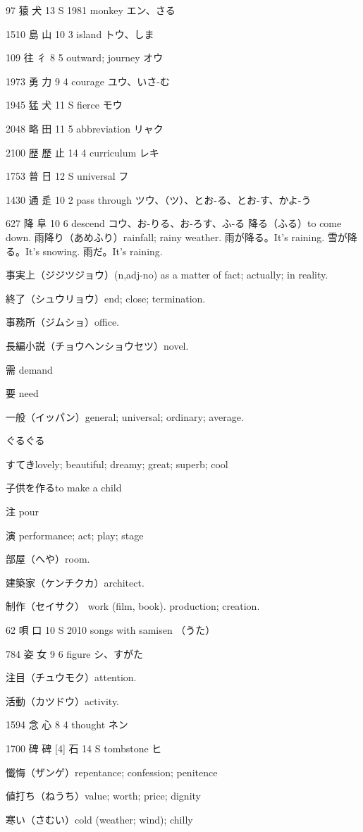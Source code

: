97	猿		犬	13	S	1981	monkey	エン、さる

1510	島		山	10	3		island	トウ、しま

109	往		彳	8	5		outward; journey	オウ

1973	勇		力	9	4		courage	ユウ、いさ-む

1945	猛		犬	11	S		fierce	モウ

2048	略		田	11	5		abbreviation	リャク

2100	歴	歷	止	14	4		curriculum	レキ

1753	普		日	12	S		universal	フ

1430	通		辵	10	2		pass through	ツウ、（ツ）、とお-る、とお-す、かよ-う

627	降		阜	10	6		descend	コウ、お-りる、お-ろす、ふ-る
降る（ふる）to come down.
雨降り（あめふり）rainfall; rainy weather.
雨が降る。It's raining.
雪が降る。It's snowing.
雨だ。It's raining.

事実上（ジジツジョウ）(n,adj-no)
as a matter of fact; actually; in reality.

終了（シュウリョウ）end; close; termination.

事務所（ジムショ）office.

長編小説（チョウヘンショウセツ）novel.

需 demand

要 need

一般（イッパン）general; universal; ordinary; average.

ぐるぐる

すてきlovely; beautiful; dreamy; great; superb; cool


子供を作るto make a child

注 pour

演 performance; act; play; stage

部屋（へや）room.

建築家（ケンチクカ）architect.

制作（セイサク）
work (film, book).
production; creation.

62	唄		口	10	S	2010	songs with samisen	（うた）

784	姿		女	9	6		figure	シ、すがた

注目（チュウモク）attention.

活動（カツドウ）activity.

1594	念		心	8	4		thought	ネン

1700	碑	碑 [4]	石	14	S		tombstone	ヒ

懺悔（ザンゲ）repentance; confession; penitence

値打ち（ねうち）value; worth; price; dignity

寒い（さむい）cold (weather; wind); chilly
